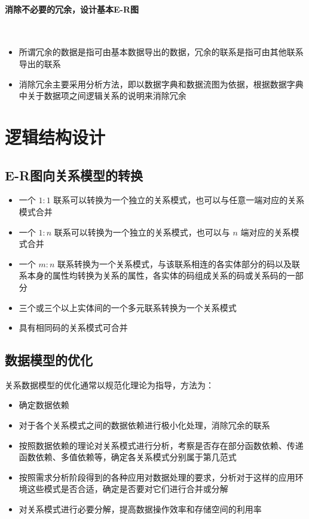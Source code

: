 \paragraph*{消除不必要的冗余，设计基本E-R图}~{}

\begin{itemize}
    \item 所谓冗余的数据是指可由基本数据导出的数据，冗余的联系是指可由其他联系导出的联系
    \item 消除冗余主要采用分析方法，即以数据字典和数据流图为依据，根据数据字典中关于数据项之间逻辑关系的说明来消除冗余
\end{itemize}

\section{逻辑结构设计}

\subsection{E-R图向关系模型的转换}
\begin{itemize}
    \item 一个 $1:1$ 联系可以转换为一个独立的关系模式，也可以与任意一端对应的关系模式合并
    \item 一个 $1:n$ 联系可以转换为一个独立的关系模式，也可以与 $n$ 端对应的关系模式合并
    \item 一个 $m:n$ 联系转换为一个关系模式，与该联系相连的各实体部分的码以及联系本身的属性均转换为关系的属性，各实体的码组成关系的码或关系码的一部分
    \item 三个或三个以上实体间的一个多元联系转换为一个关系模式
    \item 具有相同码的关系模式可合并
\end{itemize}

\subsection{数据模型的优化}
关系数据模型的优化通常以规范化理论为指导，方法为：
\begin{itemize}
    \item 确定数据依赖
    \item 对于各个关系模式之间的数据依赖进行极小化处理，消除冗余的联系
    \item 按照数据依赖的理论对关系模式进行分析，考察是否存在部分函数依赖、传递函数依赖、多值依赖等，确定各关系模式分别属于第几范式
    \item 按照需求分析阶段得到的各种应用对数据处理的要求，分析对于这样的应用环境这些模式是否合适，确定是否要对它们进行合并或分解
    \item 对关系模式进行必要分解，提高数据操作效率和存储空间的利用率
\end{itemize}

